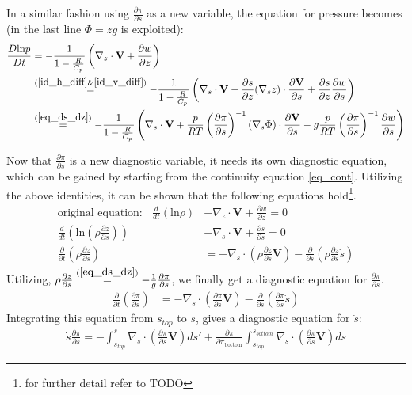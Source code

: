 In a similar fashion using $\frac{\partial \pi}{\partial s}$ as a new variable, the equation for pressure becomes (in the last line $\Phi = zg$ is exploited):
\begin{align*}
\frac{D\text{ln}p}{Dt} &= -\frac{1}{1- \frac{R}{C_p}} \left(\nabla_z \cdot \textbf{V} + \frac{\partial w}{\partial z}\right)\\
&\stackrel{(\ref{id_h_diff} \& \ref{id_v_diff})}{=} -\frac{1}{1- \frac{R}{C_p}} \left(\nabla _s \cdot \textbf{V} - \frac{\partial s}{\partial z} (\nabla _sz)\cdot \frac{\partial \textbf{V}}{\partial s} + \frac{\partial s}{\partial z}\frac{\partial w}{\partial s}\right)\\
&\stackrel{(\ref{eq_ds_dz})}{=} -\frac{1}{1- \frac{R}{C_p}} \left(\nabla _s \cdot \textbf{V} + \frac{p}{RT}\left(\frac{\partial \pi}{\partial s}\right)^{-1} (\nabla _s \Phi)\cdot\frac{\partial \textbf{V}}{\partial s} - g\frac{p}{RT}\left(\frac{\partial \pi}{\partial s}\right)^{-1} \frac{\partial w}{\partial s}\right)\\
\end{align*}

Now that $\frac{\partial \pi}{\partial s}$ is a new diagnostic variable, it needs its own diagnostic equation, which can be gained by starting from the continuity equation \ref{eq_cont}.
Utilizing the above identities, it can be shown that the following equations hold\footnote{for further detail refer to \cite{} TODO}.
\begin{align*}
\text{original equation:}~~~~ \frac{d}{dt}\left(\text{ln}\rho\right) &+ \nabla _z \cdot \textbf{V} + \frac{\partial w}{\partial z} = 0 \\
\frac{d}{dt}\left(\text{ln}\left(\rho\frac{\partial z}{\partial s}\right)\right) &+ \nabla _s \cdot \textbf{V} + \frac{\partial \dot{s}}{\partial s} = 0\\
\frac{\partial}{\partial t}\left(\rho\frac{\partial z}{\partial s}\right) &= - \nabla _s \cdot \left(\rho\frac{\partial z}{\partial s}\textbf{V}\right) - \frac{\partial }{\partial s}\left(\rho\frac{\partial z}{\partial s}\dot{s}\right)
\end{align*}
Utilizing, $\rho\frac{\partial z}{\partial s} \stackrel{(\ref{eq_ds_dz})}{=} - \frac{1}{g}\frac{\partial \pi}{\partial s}$, we finally get a diagnostic equation for $\frac{\partial \pi}{\partial s}$.
\begin{align*}
\frac{\partial}{\partial t}\left(\frac{\partial \pi}{\partial s}\right) &= - \nabla _s \cdot \left(\frac{\partial \pi}{\partial s}\textbf{V}\right) - \frac{\partial }{\partial s}\left(\frac{\partial \pi}{\partial s}\dot{s}\right)
\end{align*}
Integrating this equation from $s_{top}$ to $s$, gives a diagnostic equation for $\dot{s}$:
\begin{align*}
\dot{s}\frac{\partial \pi}{\partial s} = -\int _{s_{top}}^s\nabla _s \cdot \left(\frac{\partial \pi}{\partial s}\textbf{V}\right)ds' + \frac{\partial \pi}{\partial \pi_{\text{bottom}}} \int  _{s_{top}}^{s_{bottom}} \nabla _s \cdot \left(\frac{\partial \pi}{\partial s}\textbf{V}\right) ds
\end{align*}

